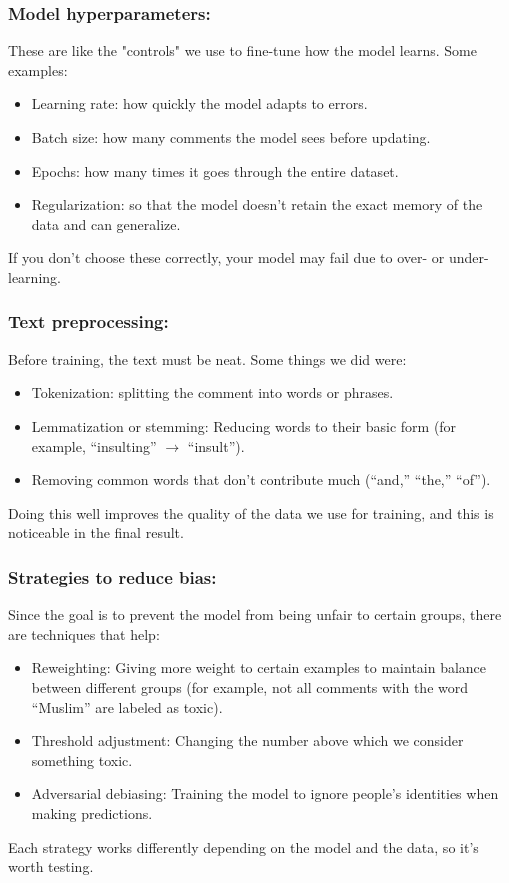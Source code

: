 \documentclass[a4paper,12pt]{article}
\begin{document}
\subsubsection*{Model hyperparameters:}
These are like the "controls" we use to fine-tune how the model learns. Some examples:
\begin{itemize}
    \item Learning rate: how quickly the model adapts to errors.
    \item Batch size: how many comments the model sees before updating.
    \item Epochs: how many times it goes through the entire dataset.
    \item Regularization: so that the model doesn't retain the exact memory of the data and can generalize.
\end{itemize}
If you don't choose these correctly, your model may fail due to over- or under-learning.

\subsubsection*{Text preprocessing:}
Before training, the text must be neat. Some things we did were:
\begin{itemize}
    \item Tokenization: splitting the comment into words or phrases.
    \item Lemmatization or stemming: Reducing words to their basic form (for example, “insulting” $\rightarrow$ “insult”).
    \item Removing common words that don't contribute much (“and,” “the,” “of”).
\end{itemize}
Doing this well improves the quality of the data we use for training, and this is noticeable in the final result.

\subsubsection*{Strategies to reduce bias:}
Since the goal is to prevent the model from being unfair to certain groups, there are techniques that help:
\begin{itemize}
    \item Reweighting: Giving more weight to certain examples to maintain balance between different groups (for example, not all comments with the word “Muslim” are labeled as toxic).
    \item Threshold adjustment: Changing the number above which we consider something toxic.
    \item Adversarial debiasing: Training the model to ignore people's identities when making predictions.
\end{itemize}
Each strategy works differently depending on the model and the data, so it's worth testing.
\end{document}
